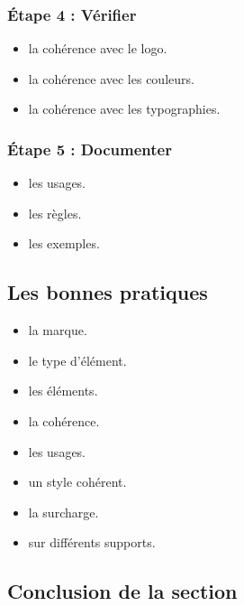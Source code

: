 \subsubsection{Étape 4 : Vérifier}

\begin{itemize}
    \item {} la cohérence avec le logo.
    \item {} la cohérence avec les couleurs.
    \item {} la cohérence avec les typographies.
\end{itemize}

\subsubsection{Étape 5 : Documenter}

\begin{itemize}
    \item {} les usages.
    \item {} les règles.
    \item {} les exemples.
\end{itemize}

\subsection{Les bonnes pratiques}

\begin{itemize}
    \item {} la marque.
    \item {} le type d'élément.
    \item {} les éléments.
    \item {} la cohérence.
    \item {} les usages.
    \item {} un style cohérent.
    \item {} la surcharge.
    \item {} sur différents supports.
\end{itemize}

\subsection*{Conclusion de la section}

